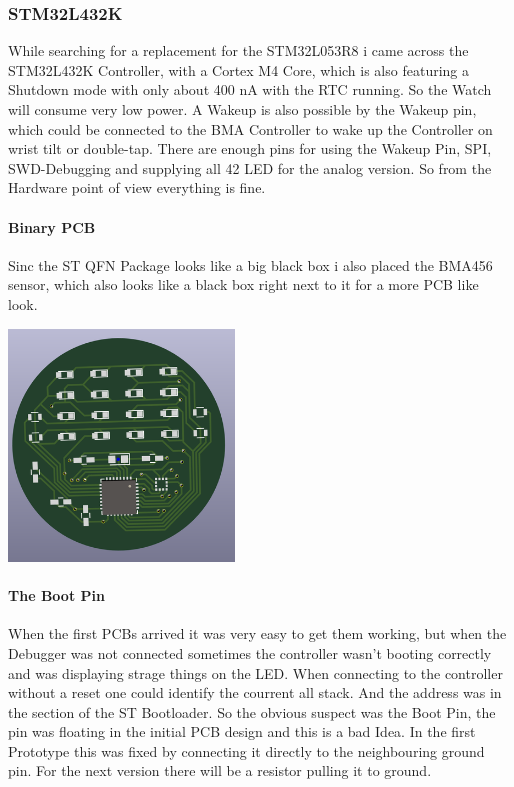 \subsubsection{STM32L432K} 
While searching for a replacement for the STM32L053R8 i came across the STM32L432K Controller, with a Cortex M4 Core, which is also featuring a Shutdown mode with only about 400 nA with the RTC running. So the Watch will consume very low power. A Wakeup is also possible by the Wakeup pin, which could be connected to the BMA Controller to wake up the Controller on wrist tilt or double-tap. There are enough pins for using the Wakeup Pin, SPI, SWD-Debugging and supplying all 42 LED for the analog version.
So from the Hardware point of view everything is fine.

\paragraph{Binary PCB}
Sinc the ST QFN Package looks like a big black box i also placed the BMA456 sensor, which also looks like a black box right next to it for a more PCB like look.
\begin{center}
\includegraphics[width=0.45\textwidth]{../Schematics_STM/Watch.png}
\end{center}
\paragraph{The Boot Pin}
When the first PCBs arrived it was very easy to get them working, but when the Debugger was not connected sometimes the controller wasn't booting correctly and was displaying strage things on the LED. When connecting to the controller without a reset one could identify the courrent all stack. And the address was in the section of the ST Bootloader. So the obvious suspect was the Boot Pin, the pin was floating in the initial PCB design and this is a bad Idea. In the first Prototype this was fixed by connecting it directly to the neighbouring ground pin. For the next version there will be a resistor pulling it to ground.

